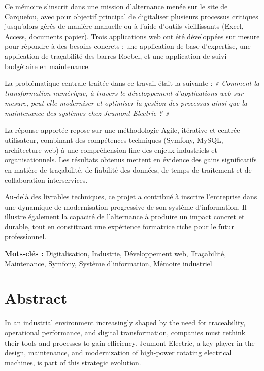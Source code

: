 \documentclass[11pt,a4paper]{article}
\begin{document}
Ce mémoire s’inscrit dans une mission d’alternance menée sur le site de Carquefou, avec pour objectif principal de digitaliser plusieurs processus critiques jusqu’alors gérés de manière manuelle ou à l’aide d’outils vieillissants (Excel, Access, documents papier). Trois applications web ont été développées sur mesure pour répondre à des besoins concrets : une application de base d’expertise, une application de traçabilité des barres Roebel, et une application de suivi budgétaire en maintenance.

La problématique centrale traitée dans ce travail était la suivante :
\textit{« Comment la transformation numérique, à travers le développement d'applications web sur mesure, peut-elle moderniser et optimiser la gestion des processus ainsi que la maintenance des systèmes chez Jeumont Electric ? »}

La réponse apportée repose sur une méthodologie Agile, itérative et centrée utilisateur, combinant des compétences techniques (Symfony, MySQL, architecture web) à une compréhension fine des enjeux industriels et organisationnels. Les résultats obtenus mettent en évidence des gains significatifs en matière de traçabilité, de fiabilité des données, de temps de traitement et de collaboration interservices.

Au-delà des livrables techniques, ce projet a contribué à inscrire l’entreprise dans une dynamique de modernisation progressive de son système d’information. Il illustre également la capacité de l’alternance à produire un impact concret et durable, tout en constituant une expérience formatrice riche pour le futur professionnel.

\bigskip

\noindent\textbf{Mots-clés :} Digitalisation, Industrie, Développement web, Traçabilité, Maintenance, Symfony, Système d'information, Mémoire industriel

\newpage
\section*{Abstract}

In an industrial environment increasingly shaped by the need for traceability, operational performance, and digital transformation, companies must rethink their tools and processes to gain efficiency. Jeumont Electric, a key player in the design, maintenance, and modernization of high-power rotating electrical machines, is part of this strategic evolution.
\end{document}
